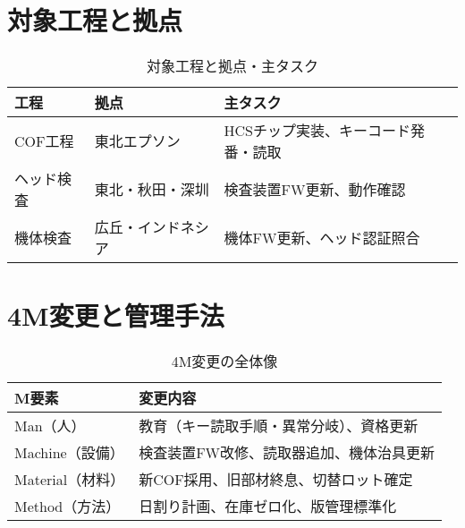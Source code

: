 \documentclass[journal,twocolumn]{IEEEtran}
\begin{document}
\section{対象工程と拠点}
\begin{table}[t]
\caption{対象工程と拠点・主タスク}
\label{tab:sitemap}
\centering
\begin{tabularx}{\columnwidth}{@{}l l X@{}}
\toprule
工程 & 拠点 & 主タスク \\
\midrule
COF工程 & 東北エプソン & HCSチップ実装、キーコード発番・読取 \\
ヘッド検査 & 東北・秋田・深圳 & 検査装置FW更新、動作確認 \\
機体検査 & 広丘・インドネシア & 機体FW更新、ヘッド認証照合 \\
\bottomrule
\end{tabularx}
\end{table}

\section{4M変更と管理手法}
\begin{table}[t]
\caption{4M変更の全体像}
\label{tab:4m}
\centering
\begin{tabularx}{\columnwidth}{@{}l X@{}}
\toprule
M要素 & 変更内容 \\
\midrule
Man（人） & 教育（キー読取手順・異常分岐）、資格更新 \\
Machine（設備） & 検査装置FW改修、読取器追加、機体治具更新 \\
Material（材料） & 新COF採用、旧部材終息、切替ロット確定 \\
Method（方法） & 日割り計画、在庫ゼロ化、版管理標準化 \\
\bottomrule
\end{tabularx}
\end{table}

\end{document}
